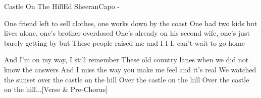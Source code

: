 \begin{song}{Castle On The Hill}{Ed Sheeran}{Capo -}

   One friend left to sell clothes, one works down by the coast
   One had two kids but lives alone, one's brother overdosed
   One's already on his second wife, one's just barely getting by but
   These people raised me and I-I-I, can't wait to go home

  And I'm on my   way, I still remember
  These old country  lanes when we did not know the answers
  And I miss the  way you make  me feel      and it's real
  We watched the sunset over the castle on the hill
              Over the castle on the hill
              Over the castle on the hill...[Verse & Pre-Chorus]

\end{song}
